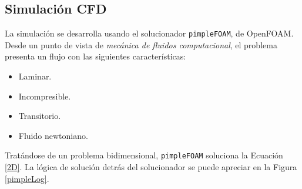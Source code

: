 \subsection{Simulaci\'on CFD}

\noindent
\justify

La simulaci\'on se desarrolla usando el solucionador \texttt{pimpleFOAM}, de OpenFOAM. Desde un punto de vista de \textit{mec\'anica de fluidos computacional}, el problema presenta un flujo con las siguientes caracter\'isticas:

\begin{itemize}
	\item Laminar.
	\item Incompresible.
	\item Transitorio.
	\item Fluido newtoniano.
\end{itemize}

\noindent
\justify

Trat\'andose de un problema bidimensional, \texttt{pimpleFOAM} soluciona la Ecuaci\'on \ref{2D}. La l\'ogica de soluci\'on detr\'as del solucionador se puede apreciar en la Figura \ref{pimpleLog}.


